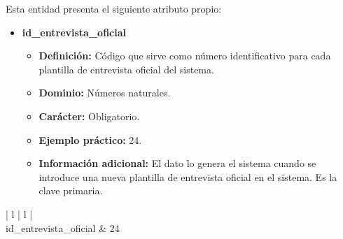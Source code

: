 \begin{description}
   \item[Descripción de los atributos propios] Esta entidad presenta el
   siguiente atributo propio:

   \begin{itemize}
    \item \textbf{id\_entrevista\_oficial}
      \begin{itemize}
         \item \textbf{Definición:} Código que sirve como número identificativo
               para cada plantilla de entrevista oficial del sistema.
         \item \textbf{Dominio:} Números naturales.
         \item \textbf{Carácter:} Obligatorio.
         \item \textbf{Ejemplo práctico:} 24.
         \item \textbf{Información adicional:} El dato lo genera el sistema
               cuando se introduce una nueva plantilla de entrevista oficial en
               el sistema. Es la clave primaria.
      \end{itemize}
   \end{itemize}

   \item[Ejemplo práctico]

   \item \begin{center}
            \begin{tabular}{ | l | l | }
            \hline
             \\
            \hline
            id\_entrevista\_oficial & 24 \\
            \hline
            \end{tabular}
         \end{center}
   \end{description}
